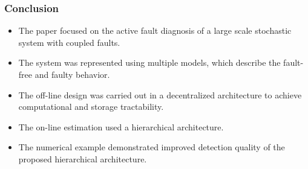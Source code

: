 \documentclass[usenames,dvipsnames]{beamer}
\begin{document}
\begin{frame}
  \frametitle{Conclusion}
  \begin{itemize}
    \item The paper focused on the active fault diagnosis of a large scale stochastic system with coupled faults.
    \item The system was represented using multiple models, which describe the fault-free and faulty behavior.
    \item The off-line design was carried out in a decentralized architecture to achieve computational and storage tractability.
    \item The on-line estimation used a hierarchical architecture.
    \item The numerical example demonstrated improved detection quality of the proposed hierarchical architecture.
  \end{itemize}
\end{frame}
\frame{\titlepage}
\end{document}

